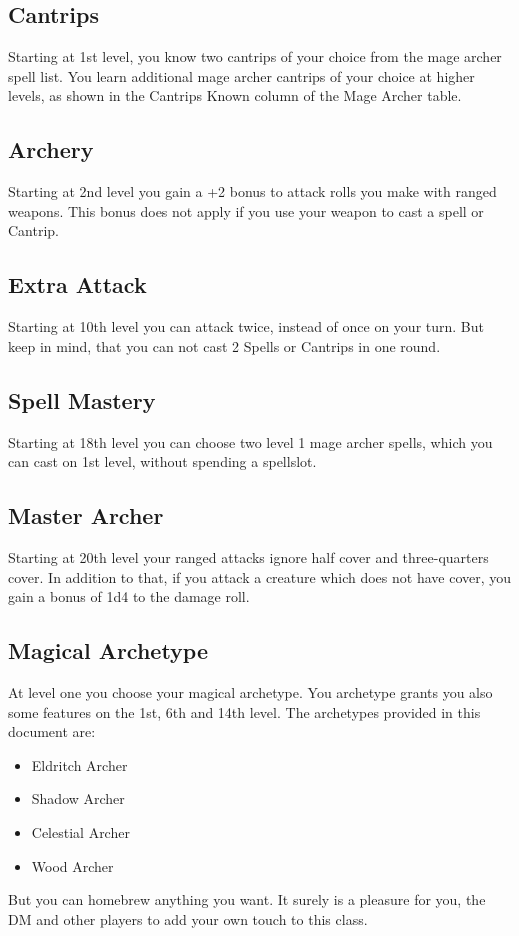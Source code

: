 \documentclass[a4paper,10pt,twoside,twocolumn, bg=print]{dndbook} %
\begin{document}
		\subsection{Cantrips}
			Starting at 1st level, you know two cantrips of your choice from the mage archer spell list. You learn additional mage archer cantrips of your choice at higher levels, as shown in the Cantrips Known column of the Mage Archer table.
		\subsection{Archery}
			Starting at 2nd level you gain a +2 bonus to attack rolls you make with ranged weapons. This bonus does not apply if you use your weapon to cast a spell or Cantrip.
		\subsection{Extra Attack}
			Starting at 10th level you can attack twice, instead of once on your turn. But keep in mind, that you can not cast 2 Spells or Cantrips in one round.
		\subsection{Spell Mastery}
			Starting at 18th level you can choose two level 1 mage archer spells, which you can cast on 1st level, without spending a spellslot.
		\subsection{Master Archer}
			Starting at 20th level your ranged attacks ignore half cover and three-quarters cover. In addition to that, if you attack a creature which does not have cover, you gain a bonus of 1d4 to the damage roll.
		\subsection{Magical Archetype}
			At level one you choose your magical archetype. You archetype grants you also some features on the 1st, 6th and 14th level. The archetypes provided in this document are:
			\begin{itemize}
				\item Eldritch Archer
				\item Shadow Archer
				\item Celestial Archer
				\item Wood Archer
			\end{itemize}
			But you can homebrew anything you want. It surely is a pleasure for you, the DM and other players to add your own touch to this class.
\end{document}
